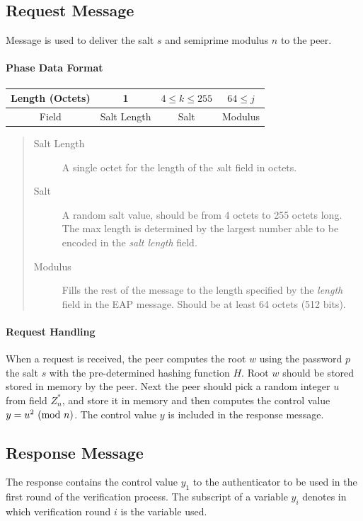 \subsection*{Request Message} Message is used to deliver the salt $s$ and semiprime modulus $n$ to the peer.

\paragraph{Phase Data Format}

\begin{center}
\begin{tabular}{|c|c|c|c|}
	\hline
	Length (Octets) & 1 & $4 \le k \le 255 $ & $64 \le j$\\
	\hline
	Field & Salt Length & Salt & Modulus\\
	\hline
\end{tabular}
\end{center}

\begin{quote}
\begin{description}
	\item[Salt Length] A single octet for the length of the \textit salt field in octets.
	\item[Salt] A random salt value, should be from 4 octets to 255 octets long.
The max length is determined by the largest number able to be encoded in the \textit {salt length} field.
	\item[Modulus] Fills the rest of the message to the length specified by the \textit{length} field in the EAP message. 
Should be at least 64 octets (512 bits).
\end{description}
\end{quote}

\paragraph{Request Handling} When a request is received, the peer computes the root $w$ using the password $p$ the salt $s$ with the pre-determined hashing function $H$.
Root $w$ should be stored stored in memory by the peer. 
Next the peer should pick a random integer $u$ from field $Z^*_n$, and store it in memory and then computes the control value $y = u^2 \ (\mathrm{mod}\ n)$.
The control value $y$ is included in the response message.

\subsection*{Response Message}
The response contains the control value $y_1$ to the authenticator to be used in the first round of the verification process.
The subscript of a variable $y_i$ denotes in which verification round $i$ is the variable used.

